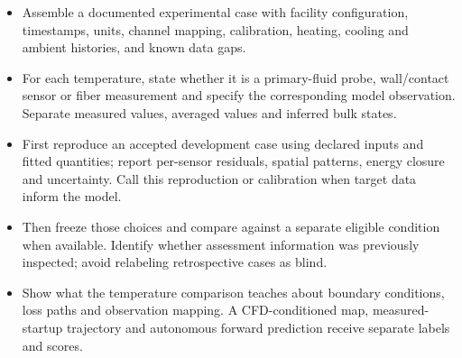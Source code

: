 \begin{itemize}[leftmargin=*]
\item Assemble a documented experimental case with facility configuration, timestamps, units, channel mapping, calibration, heating, cooling and ambient histories, and known data gaps.
\item For each temperature, state whether it is a primary-fluid probe, wall/\allowbreak{}contact sensor or fiber measurement and specify the corresponding model observation. Separate measured values, averaged values and inferred bulk states.\cite{jcgm2020measurementmodels}
\item First reproduce an accepted development case using declared inputs and fitted quantities; report per-sensor residuals, spatial patterns, energy closure and uncertainty. Call this reproduction or calibration when target data inform the model.
\item Then freeze those choices and compare against a separate eligible condition when available. Identify whether assessment information was previously inspected; avoid relabeling retrospective cases as blind.
\item Show what the temperature comparison teaches about boundary conditions, loss paths and observation mapping. A CFD-conditioned map, measured-startup trajectory and autonomous forward prediction receive separate labels and scores.
\end{itemize}

